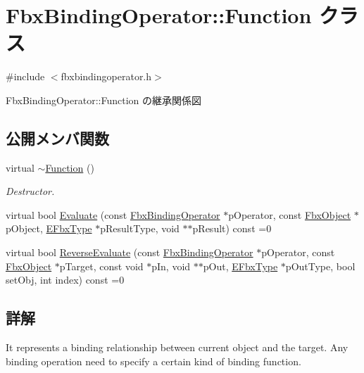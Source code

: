 \hypertarget{class_fbx_binding_operator_1_1_function}{}\section{Fbx\+Binding\+Operator\+:\+:Function クラス}
\label{class_fbx_binding_operator_1_1_function}


{\ttfamily \#include $<$fbxbindingoperator.\+h$>$}



Fbx\+Binding\+Operator\+:\+:Function の継承関係図
\subsection*{公開メンバ関数}
\begin{DoxyCompactItemize}
\item 
virtual \hyperlink{class_fbx_binding_operator_1_1_function_a87c75b7d2a19945c11161104691294c9}{$\sim$\+Function} ()
\begin{DoxyCompactList}\small\item\em Destructor. \end{DoxyCompactList}\item 
virtual bool \hyperlink{class_fbx_binding_operator_1_1_function_aa238a63d12508db3cb5c00a4b157524e}{Evaluate} (const \hyperlink{class_fbx_binding_operator}{Fbx\+Binding\+Operator} $\ast$p\+Operator, const \hyperlink{class_fbx_object}{Fbx\+Object} $\ast$p\+Object, \hyperlink{fbxpropertytypes_8h_a73913a5ddfb20e57c6f25e9e6784bd92}{E\+Fbx\+Type} $\ast$p\+Result\+Type, void $\ast$$\ast$p\+Result) const =0
\item 
virtual bool \hyperlink{class_fbx_binding_operator_1_1_function_a9bbeec993a6e453a6569e7f40a85fd52}{Reverse\+Evaluate} (const \hyperlink{class_fbx_binding_operator}{Fbx\+Binding\+Operator} $\ast$p\+Operator, const \hyperlink{class_fbx_object}{Fbx\+Object} $\ast$p\+Target, const void $\ast$p\+In, void $\ast$$\ast$p\+Out, \hyperlink{fbxpropertytypes_8h_a73913a5ddfb20e57c6f25e9e6784bd92}{E\+Fbx\+Type} $\ast$p\+Out\+Type, bool set\+Obj, int index) const =0
\end{DoxyCompactItemize}


\subsection{詳解}
It represents a binding relationship between current object and the target. Any binding operation need to specify a certain kind of binding function. 


